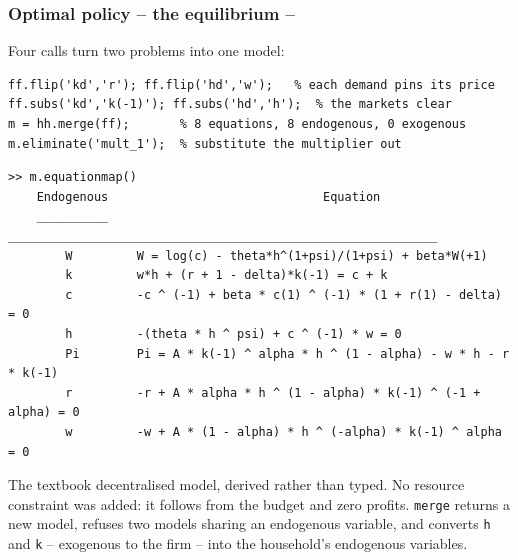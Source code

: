 \documentclass[10pt,slidestop]{beamer}
\theoremstyle{plain}
\begin{document}
\begin{frame}[c,fragile]
  \frametitle{Optimal policy -- the equilibrium --}

  Four calls turn two problems into one model:

  \begin{lstlisting}[style=MatlabConsole,basicstyle=\ttfamily\scriptsize]
ff.flip('kd','r'); ff.flip('hd','w');   % each demand pins its price
ff.subs('kd','k(-1)'); ff.subs('hd','h');  % the markets clear
m = hh.merge(ff);       % 8 equations, 8 endogenous, 0 exogenous
m.eliminate('mult_1');  % substitute the multiplier out
  \end{lstlisting}

  \begin{lstlisting}[style=MatlabConsole,basicstyle=\ttfamily\tiny]
>> m.equationmap()
    Endogenous                              Equation
    __________    ____________________________________________________________
        W         W = log(c) - theta*h^(1+psi)/(1+psi) + beta*W(+1)
        k         w*h + (r + 1 - delta)*k(-1) = c + k
        c         -c ^ (-1) + beta * c(1) ^ (-1) * (1 + r(1) - delta) = 0
        h         -(theta * h ^ psi) + c ^ (-1) * w = 0
        Pi        Pi = A * k(-1) ^ alpha * h ^ (1 - alpha) - w * h - r * k(-1)
        r         -r + A * alpha * h ^ (1 - alpha) * k(-1) ^ (-1 + alpha) = 0
        w         -w + A * (1 - alpha) * h ^ (-alpha) * k(-1) ^ alpha = 0
  \end{lstlisting}

  \small The textbook decentralised model, derived rather than typed. No resource
  constraint was added: it follows from the budget and zero profits. \verb+merge+ returns a
  new model, refuses two models sharing an endogenous variable, and converts \verb+h+ and
  \verb+k+ -- exogenous to the firm -- into the household's endogenous variables.

\end{frame}
\end{document}
